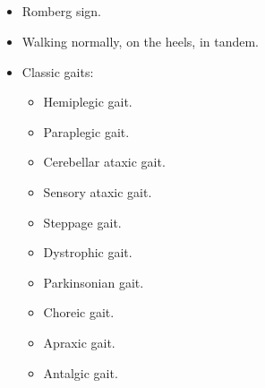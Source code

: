 \documentclass[a4paper,12pt]{extbook}
\begin{document}
\subsection*{}
\begin{latin}
\begin{itemize}
\item Romberg sign.
\item Walking normally, on the heels, in tandem.
\item Classic gaits:
  \begin{itemize}
  \item Hemiplegic gait.
  \item Paraplegic gait.
  \item Cerebellar ataxic gait.
  \item Sensory ataxic gait.
  \item Steppage gait.
  \item Dystrophic gait.
  \item Parkinsonian gait.
  \item Choreic gait.
  \item Apraxic gait.
  \item Antalgic gait.
  \end{itemize}
\end{itemize}
\end{latin}

\endgroup
\ifNEStandalone\expandafter\enddocument\fi
\end{document}
